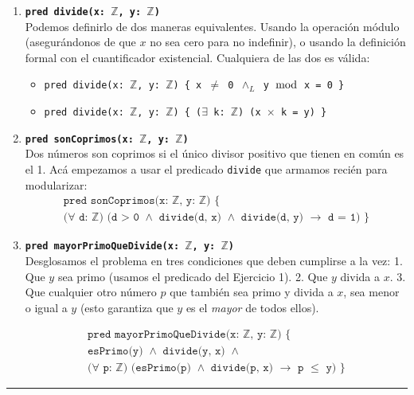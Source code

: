 \begin{enumerate}[label=\textbf{\alph*)}]

    \item \textbf{\texttt{pred divide(x: $\mathbb{Z}$, y: $\mathbb{Z}$)}} \\
    Podemos definirlo de dos maneras equivalentes. Usando la operación módulo (asegurándonos de que $x$ no sea cero para no indefinir), o usando la definición formal con el cuantificador existencial. Cualquiera de las dos es válida:
    \begin{itemize}
        \item \texttt{pred divide(x: $\mathbb{Z}$, y: $\mathbb{Z}$) \{ x $\neq$ 0 $\wedge_L$ y $\bmod$ x = 0 \}}
        \item \texttt{pred divide(x: $\mathbb{Z}$, y: $\mathbb{Z}$) \{ ($\exists$ k: $\mathbb{Z}$) (x $\times$ k = y) \}}
    \end{itemize}

    \vspace{0.4cm}
    \item \textbf{\texttt{pred sonCoprimos(x: $\mathbb{Z}$, y: $\mathbb{Z}$)}} \\
    Dos números son coprimos si el único divisor positivo que tienen en común es el 1. Acá empezamos a usar el predicado \texttt{divide} que armamos recién para modularizar:
    \begin{multline*}
    \texttt{pred sonCoprimos(x: $\mathbb{Z}$, y: $\mathbb{Z}$) \{} \\
    \texttt{($\forall$ d: $\mathbb{Z}$) (d > 0 $\wedge$ divide(d, x) $\wedge$ divide(d, y) $\rightarrow$ d = 1) \}}
    \end{multline*}

    \vspace{0.4cm}
    \item \textbf{\texttt{pred mayorPrimoQueDivide(x: $\mathbb{Z}$, y: $\mathbb{Z}$)}} \\
    Desglosamos el problema en tres condiciones que deben cumplirse a la vez:
    1. Que $y$ sea primo (usamos el predicado del Ejercicio 1).
    2. Que $y$ divida a $x$.
    3. Que cualquier otro número $p$ que también sea primo y divida a $x$, sea menor o igual a $y$ (esto garantiza que $y$ es el \textit{mayor} de todos ellos).
    
    \begin{multline*}
    \texttt{pred mayorPrimoQueDivide(x: $\mathbb{Z}$, y: $\mathbb{Z}$) \{} \\
    \texttt{esPrimo(y) $\wedge$ divide(y, x) $\wedge$} \\
    \texttt{($\forall$ p: $\mathbb{Z}$) (esPrimo(p) $\wedge$ divide(p, x) $\rightarrow$ p $\leq$ y) \}}
    \end{multline*}

\end{enumerate}

\vspace{0.5cm}
\hrule
\vspace{0.5cm}